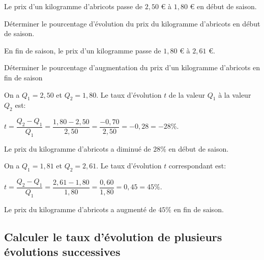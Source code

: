 \documentclass[11pt,a4paper]{book}
\begin{document}
\begin{bmethode}
    
    Le prix d'un kilogramme d'abricots passe de $2,50$ \euro{} à $1,80$ \euro{} en début de saison.
    \begin{enumMet}
        \item Déterminer le pourcentage d'évolution du prix du kilogramme d'abricots en début de saison.
        \item En fin de saison, le prix d'un kilogramme passe de $1,80$ \euro{} à $2,61$ \euro{}.
        
        Déterminer le pourcentage d'augmentation du prix d'un kilogramme d'abricots en fin de saison
    \end{enumMet}
    
    \begin{enumMet}
        \item On a $Q_1=2,50$ et $Q_2=1,80$. Le taux d'évolution $t$ de la valeur $Q_1$ à la valeur $Q_2$ est:
        
        $t=\dfrac{Q_2-Q_1}{Q_1}=\dfrac{1,80-2,50}{2,50}=\dfrac{-0,70}{2,50}=-0,28=-28\%$.
        
        Le prix du kilogramme d'abricots a diminué de $28\%$ en début de saison.
        \item On a $Q_1=1,81$ et $Q_2=2,61$. Le taux d'évolution $t$ correspondant est:
        
        $t=\dfrac{Q_2-Q_1}{Q_1}=\dfrac{2,61-1,80}{1,80}=\dfrac{0,60}{1,80}=0,45=45\%$.
        
        Le prix du kilogramme d'abricots a augmenté de $45\%$ en fin de saison.
    \end{enumMet}
\end{bmethode}

\subsection{Calculer le taux d'évolution de plusieurs évolutions successives}
\end{document}
